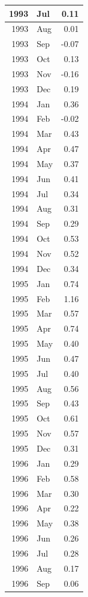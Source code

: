 \documentclass[
]{article}
\begin{document}
\begin{table}[H]
\begin{tabular}[t]{r|l|r}
\hline
1993 & Jul & 0.11\\
\hline
1993 & Aug & 0.01\\
\hline
1993 & Sep & -0.07\\
\hline
1993 & Oct & 0.13\\
\hline
1993 & Nov & -0.16\\
\hline
1993 & Dec & 0.19\\
\hline
1994 & Jan & 0.36\\
\hline
1994 & Feb & -0.02\\
\hline
1994 & Mar & 0.43\\
\hline
1994 & Apr & 0.47\\
\hline
1994 & May & 0.37\\
\hline
1994 & Jun & 0.41\\
\hline
1994 & Jul & 0.34\\
\hline
1994 & Aug & 0.31\\
\hline
1994 & Sep & 0.29\\
\hline
1994 & Oct & 0.53\\
\hline
1994 & Nov & 0.52\\
\hline
1994 & Dec & 0.34\\
\hline
1995 & Jan & 0.74\\
\hline
1995 & Feb & 1.16\\
\hline
1995 & Mar & 0.57\\
\hline
1995 & Apr & 0.74\\
\hline
1995 & May & 0.40\\
\hline
1995 & Jun & 0.47\\
\hline
1995 & Jul & 0.40\\
\hline
1995 & Aug & 0.56\\
\hline
1995 & Sep & 0.43\\
\hline
1995 & Oct & 0.61\\
\hline
1995 & Nov & 0.57\\
\hline
1995 & Dec & 0.31\\
\hline
1996 & Jan & 0.29\\
\hline
1996 & Feb & 0.58\\
\hline
1996 & Mar & 0.30\\
\hline
1996 & Apr & 0.22\\
\hline
1996 & May & 0.38\\
\hline
1996 & Jun & 0.26\\
\hline
1996 & Jul & 0.28\\
\hline
1996 & Aug & 0.17\\
\hline
1996 & Sep & 0.06\\

\end{tabular}
\end{table}
\end{document}
